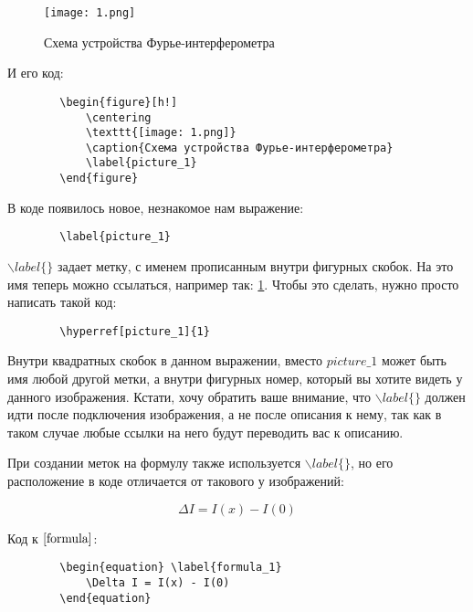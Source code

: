     \begin{figure}[h!]
        \centering
        \texttt{[image: 1.png]}
        \caption{Схема устройства Фурье-интерферометра}
        \label{picture_1}
    \end{figure}
    
    И его код:
    
    \begin{verbatim}
        \begin{figure}[h!]
            \centering
            \texttt{[image: 1.png]}
            \caption{Схема устройства Фурье-интерферометра}
            \label{picture_1}
        \end{figure}
    \end{verbatim}
    
    В коде появилось новое, незнакомое нам выражение: 

    \begin{verbatim}
        \label{picture_1}    
    \end{verbatim}

    $\backslash label\{\}$ задает метку, 
    с именем прописанным внутри фигурных скобок. На это имя теперь можно ссылаться, например так: 
    \hyperref[picture_1]{1}. Чтобы это сделать, нужно просто написать такой код:
    
    \begin{verbatim}
        \hyperref[picture_1]{1}
    \end{verbatim}
    
    Внутри квадратных скобок в данном выражении, вместо $picture\_1$ может быть имя любой другой метки, а внутри фигурных номер, который вы хотите видеть у данного изображения. Кстати, хочу обратить ваше внимание, что $\backslash label\{\}$ должен идти после подключения изображения, а не после описания к нему, так как в таком случае любые ссылки на него будут переводить вас к описанию.
    
    При создании меток на формулу также используется $\backslash label\{\}$, но его расположение в коде отличается от такового у изображений:
    
    \begin{equation} \label{formula}
        \Delta I = I(x) - I(0)
    \end{equation}
    
    Код к $\eqref{formula}$:
    
    
    \begin{verbatim}
        \begin{equation} \label{formula_1}
            \Delta I = I(x) - I(0)
        \end{equation}
    \end{verbatim}
    
